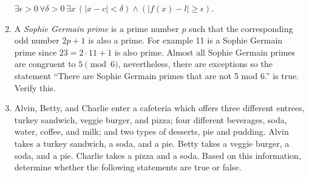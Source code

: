 \documentclass[10pt,]{book}
\theoremstyle{plain}
\theoremstyle{definition}
\theoremstyle{definition}
\numberwithin{equation}{section}
\newcommand{\hint}[1]{ }
\newcommand{\lt}{ < }
\begin{document}
\begin{enumerate}[label=(\alph*)]
{        \(\displaystyle \exists \epsilon>0 \, \forall 
        \delta>0 \, \exists x \, (|x-c| \lt  \delta)  \land  (|f(x)-l| \geq \epsilon)\).

        }
\item\hypertarget{li-190}{}
        A  \emph{Sophie Germain prime} is a prime number \(p\)
        such that the corresponding odd number \(2p+1\) is also a prime.  For example 11 is a 
        Sophie Germain prime since \(23 = 2\cdot 11 + 1\) is also prime.  Almost all Sophie Germain
        primes are congruent to \(5 \pmod{6}\), nevertheless, there are exceptions \textemdash{} so the
        statement ``There are Sophie Germain primes that are not 5 mod 6.'' is true.  Verify this.

        \hint{The exceptions are very small prime numbers. You should be able to find them easily.}
\item\hypertarget{li-191}{}
    Alvin, Betty, and Charlie enter a cafeteria which offers three different
    entrees, turkey sandwich, veggie burger, and pizza; four different
    beverages, soda, water, coffee, and milk; and two types of desserts,
    pie and pudding. Alvin takes a turkey sandwich, a soda, and a pie.
    Betty takes a veggie burger, a soda, and a pie. Charlie takes a pizza
    and a soda. Based on this information, determine whether the following
    statements are true or false.


\end{enumerate}
\end{document}
